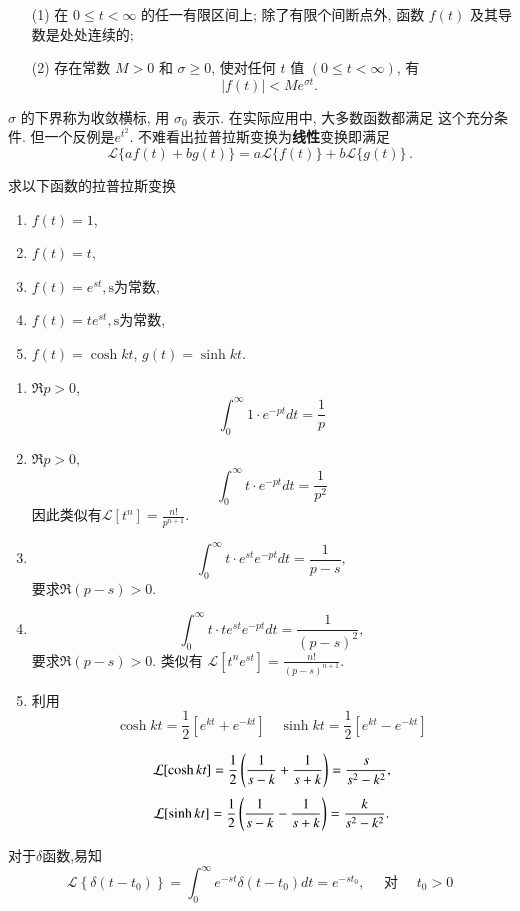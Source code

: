 \begin{enumerate}
    \item[(1)]  在 $0 \leqslant t<\infty$ 的任一有限区间上; 除了有限个间断点外, 函数 $f(t)$ 及其导数是处处连续的;
    \item[(2)]  存在常数 $M>0$ 和 $\sigma \geqslant 0$, 使对任何 $t$ 值 $(0 \leqslant t<\infty)$, 有
    $$
    |f(t)|<M e^{\sigma t} \text {. }
    $$
\end{enumerate}
$\sigma$ 的下界称为收敛横标, 用 $\sigma_0$ 表示. 在实际应用中, 大多数函数都满足 这个充分条件.
但一个反例是$e^{t^2}$.
不难看出拉普拉斯变换为\textbf{线性}变换即满足
$$
\mathcal{L}\{a f(t)+b g(t)\}=a \mathcal{L}\{f(t)\}+b \mathcal{L}\{g(t)\} \,.
$$
\begin{examplebox}{求以下函数的拉普拉斯变换
    \begin{enumerate}
        \item $f(t) = 1$,
        \item $f(t) = t$,
        \item $f(t) =e^{s t}, \textrm{s为常数}$,
        \item $f(t) = t e^{s t}, \textrm{s为常数}$,
        \item $f(t) = \cosh {k t}$, $g(t)= \sinh {kt}$.
    \end{enumerate}}

    \begin{enumerate}
        \item $\Re p > 0$, 
            $$\int_{0}^{\infty} 1 \cdot e^{-p t} dt = \frac{1}{p}$$
        \item  $\Re p > 0$, 
            $$\int_{0}^{\infty} t \cdot e^{-p t} dt = \frac{1}{p^2}$$
            因此类似有$\mathcal{L}[t^n] = \frac{n!}{p^{n+1}}$.
        \item $$
            \int_{0}^{\infty} t \cdot e^{s t} e^{-p t} dt = \frac{1}{p-s} , 
        $$
        要求$\Re (p-s) > 0$.
        \item 
        $$
        \int_{0}^{\infty} t \cdot t e^{s t} e^{-p t} dt = \frac{1}{(p-s)^2} ,
        $$
        要求$\Re (p-s) > 0$.  
    类似有 $\mathcal{L}[t^n e^{s t}] = \frac{n!}{(p-s)^{n+1}}$.
        \item 利用
        $$
         \cosh{k t}  = \frac{1}{2} \left[ e^{kt} + e^{-kt}\right] \quad 
         \sinh{k t}  = \frac{1}{2} \left[ e^{kt} - e^{-kt}\right] 
        $$

        $$
        \mathcal{L}[ \cosh{k t} ] = {\frac{1}{2}} \left( \frac{1}{s-k} + \frac{1}{s+k} \right) = \frac{s}{s^2 - k^2} ,
        $$
        $$
        \mathcal{L}[ \sinh{k t} ] = {\frac{1}{2}} \left( \frac{1}{s-k} - \frac{1}{s+k} \right) = \frac{k}{s^2 - k^2} .
        $$
    \end{enumerate}
\end{examplebox}
对于$\delta$函数,易知
$$
\mathcal{L}\left\{\delta\left(t-t_0\right)\right\}=\int_0^{\infty} e^{-s t} \delta\left(t-t_0\right) d t=e^{-s t_0}, \quad \text { 对 } \quad t_0>0
$$
